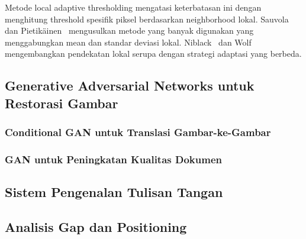 \documentclass[journal]{IEEEtran}
\begin{document}
Metode local adaptive thresholding mengatasi keterbatasan ini dengan menghitung threshold spesifik piksel berdasarkan neighborhood lokal. Sauvola dan Pietikäinen~\cite{sauvola2000adaptive} mengusulkan metode yang banyak digunakan yang menggabungkan mean dan standar deviasi lokal. Niblack~\cite{niblack1986introduction} dan Wolf~\cite{wolf2004extraction} mengembangkan pendekatan lokal serupa dengan strategi adaptasi yang berbeda.


\subsection{Generative Adversarial Networks untuk Restorasi Gambar}

\subsubsection{Conditional GAN untuk Translasi Gambar-ke-Gambar}


\subsubsection{GAN untuk Peningkatan Kualitas Dokumen}


\subsection{Sistem Pengenalan Tulisan Tangan}


\subsection{Analisis Gap dan Positioning}

\end{document}
